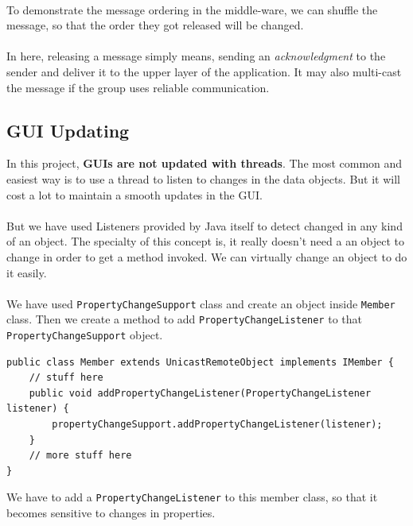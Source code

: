 \documentclass[a4paper,english,twoside]{article}
\begin{document}
\paragraph{}
To demonstrate the message ordering in the middle-ware, we can shuffle the message, so that the order they got released will be changed.

\paragraph{}
In here, releasing a message simply means, sending an \textit{acknowledgment} to the sender and deliver it to the upper layer of the application. It may also multi-cast the message if the group uses reliable communication.
\newpage
\subsection{GUI Updating}
In this project, \textbf{GUIs are not updated with threads}. The most common and easiest way is to use a thread to listen to changes in the data objects. But it will cost a lot to maintain a smooth updates in the GUI.

\paragraph{}
But we have used Listeners provided by Java itself to detect changed in any kind of an object. The specialty of this concept is, it really doesn't need a an object to change in order to get a method invoked. We can virtually change an object to do it easily.

\paragraph{}
We have used \texttt{PropertyChangeSupport} class and create an object inside \texttt{Member} class. Then we create a method to add \texttt{PropertyChangeListener} to that \texttt{PropertyChangeSupport} object.

{\small { \begin{lstlisting}
public class Member extends UnicastRemoteObject implements IMember {
    // stuff here
    public void addPropertyChangeListener(PropertyChangeListener listener) {
        propertyChangeSupport.addPropertyChangeListener(listener);
    }
    // more stuff here
}
\end{lstlisting}}}

We have to add a \texttt{PropertyChangeListener} to this member class, so that it becomes sensitive to changes in properties.
\end{document}
